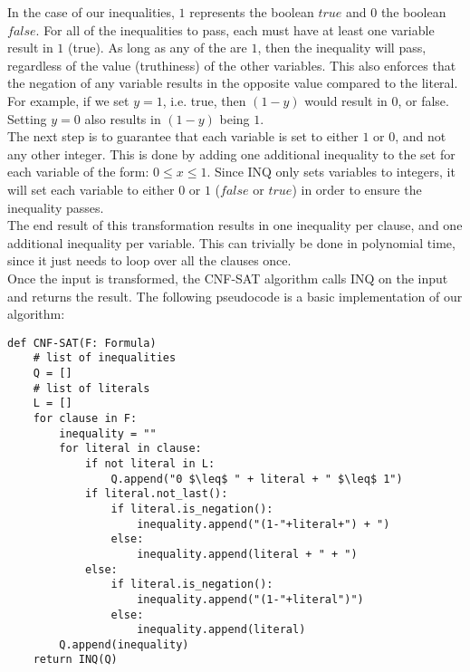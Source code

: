 \documentclass[letterpaper,notitlepage,twoside]{article}
\begin{document}
In the case of our inequalities, $1$ represents the boolean $true$ and $0$ the boolean $false$. For all of the inequalities to pass, each must have at least one variable result in $1$ (true). As long as any of the are $1$, then the inequality will pass, regardless of the value (truthiness) of the other variables. This also enforces that the negation of any variable results in the opposite value compared to the literal. For example, if we set $y=1$, i.e. true, then $(1-y)$ would result in $0$, or false. Setting $y=0$ also results in $(1-y)$ being $1$. \\

The next step is to guarantee that each variable is set to either $1$ or $0$, and not any other integer. This is done by adding one additional inequality to the set for each variable of the form: $0 \leq x \leq 1$. Since INQ only sets variables to integers, it will set each variable to either $0$ or $1$ ($false$ or $true$) in order to ensure the inequality passes. \\

The end result of this transformation results in one inequality per clause, and one additional inequality per variable. This can trivially be done in polynomial time, since it just needs to loop over all the clauses once. \\

Once the input is transformed, the CNF-SAT algorithm calls INQ on the input and returns the result. The following pseudocode is a basic implementation of our algorithm: \\
\begin{minipage}{\textwidth}
\begin{lstlisting}[frame=single, mathescape=true, linewidth=14.5cm]
def CNF-SAT(F: Formula)
    # list of inequalities
    Q = []
    # list of literals
    L = []
    for clause in F:
        inequality = ""
        for literal in clause:
            if not literal in L:
                Q.append("0 $\leq$ " + literal + " $\leq$ 1")
            if literal.not_last():
                if literal.is_negation():
                    inequality.append("(1-"+literal+") + ")
                else:
                    inequality.append(literal + " + ")
            else:
                if literal.is_negation():
                    inequality.append("(1-"+literal")")
                else:
                    inequality.append(literal)
        Q.append(inequality)
    return INQ(Q)
\end{lstlisting}
\end{minipage}
\end{document}
